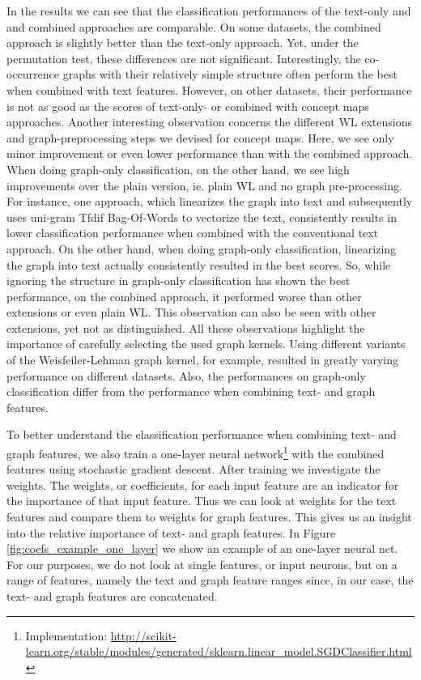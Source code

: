In the results we can see that the classification performances of the text-only and and combined approaches are comparable.
On some datasets, the combined approach is slightly better than the text-only approach.
Yet, under the permutation test, these differences are not significant.
Interestingly, the co-occurrence graphs with their relatively simple structure often perform the best when combined with text features.
However, on other datasets, their performance is not as good as the scores of text-only- or combined with concept maps approaches.
Another interesting observation concerns the different WL extensions and graph-preprocessing steps we devised for concept maps.
Here, we see only minor improvement or even lower performance than with the combined approach.
When doing graph-only classification, on the other hand, we see high improvements over the plain version, ie. plain WL and no graph pre-processing.
For instance, one approach, which linearizes the graph into text and subsequently uses uni-gram Tfdif Bag-Of-Words to vectorize the text, consistently results in lower classification performance when combined with the conventional text approach.
On the other hand, when doing graph-only classification, linearizing the graph into text actually consistently resulted in the best scores.
So, while ignoring the structure in graph-only classification has shown the best performance, on the combined approach, it performed worse than other extensions or even plain WL.
This observation can also be seen with other extensions, yet not as distinguished.
All these observations highlight the importance of carefully selecting the used graph kernels.
Using different variants of the Weisfeiler-Lehman graph kernel, for example, resulted in greatly varying performance on different datasets.
Also, the performances on graph-only classification differ from the performance when combining text- and graph features.

To better understand the classification performance when combining text- and graph features, we also train a one-layer neural network\footnote{Implementation: \url{http://scikit-learn.org/stable/modules/generated/sklearn.linear_model.SGDClassifier.html}} with the combined features using stochastic gradient descent. After training we investigate the weights.
The weights, or coefficients, for each input feature are an indicator for the importance of that input feature.
Thus we can look at weights for the text features and compare them to weights for graph features.
This gives us an insight into the relative importance of text- and graph features.
In Figure \ref{fig:coefs_example_one_layer} we show an example of an one-layer neural net.
For our purposes, we do not look at single features, or input neurons, but on a range of features, namely the text and graph feature ranges since, in our case, the text- and graph features are concatenated.

